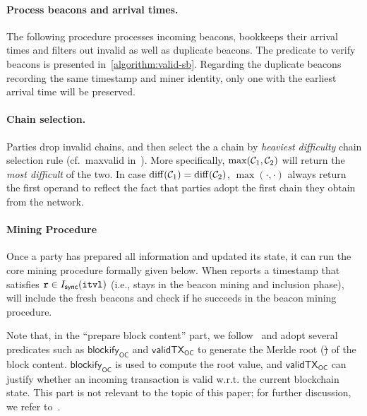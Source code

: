 

\paragraph{Process beacons and arrival times.}
%
The following procedure processes incoming beacons, bookkeeps their arrival times and filters out invalid as well as duplicate beacons.
%
The predicate to verify beacons is presented in~\cref{algorithm:valid-sb}.
%
Regarding the duplicate beacons recording the same timestamp and miner identity, only one with the earliest arrival time will be preserved.



\paragraph{Chain selection.}
%
Parties drop invalid chains, and then select the a chain by \emph{heaviest difficulty} chain selection rule (cf.~\textsf{maxvalid} in~\cite{C:GarKiaLeo17}).
%
More specifically, $\max(\mathcal{C}_1, \mathcal{C}_2)$ will return the \emph{most difficult} of the two.
%
In case $\mathrm{diff}(\mathcal{C}_1) = \mathrm{diff}(\mathcal{C}_2)$, $\max(\cdot, \cdot)$  always return the first operand to reflect the fact that parties adopt the first chain they obtain from the network.



\paragraph{Mining Procedure}
%
Once a party \party has prepared all information and updated its state, it can run the core mining procedure formally given below.
%
When \localTime reports a timestamp that satisfies $\mathtt{r} \in I_{\mathsf{sync}}({\mathtt{itvl}})$ (i.e., \party stays in the beacon mining and inclusion phase), \party will include the fresh beacons and check if he succeeds in the beacon mining procedure.

Note that, in the ``prepare block content'' part, we follow~\cite{C:BMTZ17} and adopt several predicates such as $\mathsf{blockify}_{\mathsf{OC}}$ and $\mathsf{validTX}_{\mathsf{OC}}$ to generate the Merkle root (\st) of the block content.
%
$\mathsf{blockify}_{\mathsf{OC}}$ is used to compute the root value, and $\mathsf{validTX}_{\mathsf{OC}}$ can justify whether an incoming transaction is valid w.r.t. the current blockchain state.
%
This part is not relevant to the topic of this paper; for further discussion, we refer to~\cite{C:BMTZ17}.

